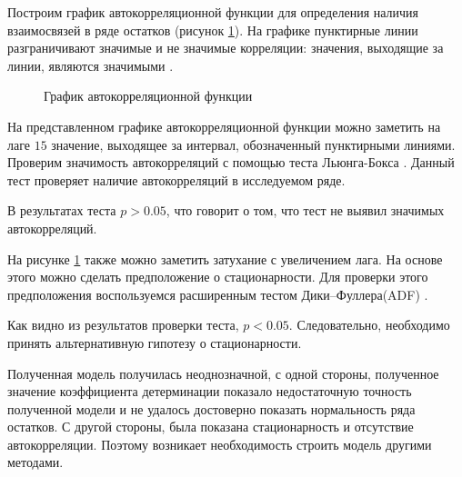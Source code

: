 Построим график автокорреляционной функции для определения наличия взаимосвязей в ряде остатков (рисунок \ref{img:resid_acf}). На графике пунктирные линии разграничивают значимые и не значимые корреляции: значения, выходящие за линии, являются значимыми \cite[с.376]{Teetor2011RCook}.
\begin{figure}[ht]
\caption{График автокорреляционной функции}
\label{img:resid_acf}
\end{figure}
На представленном графике автокорреляционной функции можно заметить на лаге $15$ значение, выходящее за интервал, обозначенный пунктирными линиями. Проверим значимость автокорреляций с помощью теста Льюнга-Бокса \cite[с.377-378]{Teetor2011RCook}. Данный тест проверяет наличие автокорреляций в исследуемом ряде.

В результатах теста $p > 0.05$, что говорит о том, что тест не выявил значимых автокорреляций.

На рисунке \ref{img:resid_acf} также можно заметить затухание с увеличением лага. На основе этого можно сделать предположение о стационарности. Для проверки этого предположения воспользуемся расширенным тестом Дики--Фуллера(ADF) \cite{Dickey1979Distribution}.

Как видно из результатов проверки теста, $p < 0.05$. Следовательно, необходимо принять альтернативную гипотезу о стационарности.

Полученная модель получилась неоднозначной, с одной стороны, полученное значение коэффициента детерминации показало недостаточную точность полученной модели и не удалось достоверно показать нормальность ряда остатков. С другой стороны, была показана стационарность и отсутствие автокорреляции. Поэтому возникает необходимость строить модель другими методами.

